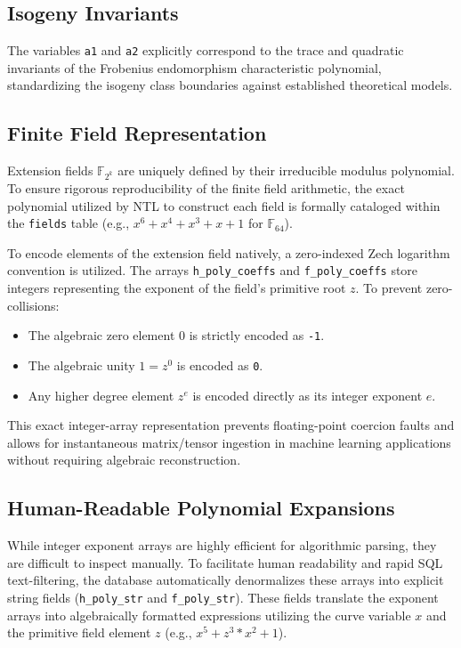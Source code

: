 \documentclass[letterpaper, 11pt]{article}
\begin{document}
\subsection{Isogeny Invariants}
The variables \texttt{a1} and \texttt{a2} explicitly correspond to the trace and quadratic invariants of the Frobenius endomorphism characteristic polynomial, standardizing the isogeny class boundaries against established theoretical models.

\subsection{Finite Field Representation}
Extension fields $\mathbb{F}_{2^k}$ are uniquely defined by their irreducible modulus polynomial. To ensure rigorous reproducibility of the finite field arithmetic, the exact polynomial utilized by NTL to construct each field is formally cataloged within the \texttt{fields} table (e.g., $x^6 + x^4 + x^3 + x + 1$ for $\mathbb{F}_{64}$). 

To encode elements of the extension field natively, a zero-indexed Zech logarithm convention is utilized. The arrays \texttt{h\_poly\_coeffs} and \texttt{f\_poly\_coeffs} store integers representing the exponent of the field's primitive root $z$. To prevent zero-collisions:
\begin{itemize}
    \item The algebraic zero element $0$ is strictly encoded as \texttt{-1}.
    \item The algebraic unity $1 = z^0$ is encoded as \texttt{0}.
    \item Any higher degree element $z^e$ is encoded directly as its integer exponent $e$.
\end{itemize}
This exact integer-array representation prevents floating-point coercion faults and allows for instantaneous matrix/tensor ingestion in machine learning applications without requiring algebraic reconstruction.

\subsection{Human-Readable Polynomial Expansions}
While integer exponent arrays are highly efficient for algorithmic parsing, they are difficult to inspect manually. To facilitate human readability and rapid SQL text-filtering, the database automatically denormalizes these arrays into explicit string fields (\texttt{h\_poly\_str} and \texttt{f\_poly\_str}). These fields translate the exponent arrays into algebraically formatted expressions utilizing the curve variable $x$ and the primitive field element $z$ (e.g., $x^5 + z^3*x^2 + 1$).
\end{document}
